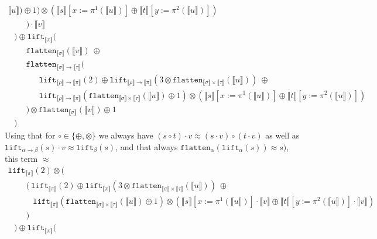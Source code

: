 \documentclass[runningheads,a4paper]{llncs}
\newcommand{\typeinterpret}[1]{\llbracket #1 \rrbracket}
\newcommand{\interpret}[1]{\llbracket #1 \rrbracket}
\newcommand{\arrtype}{\rightarrow}
\newcommand{\flatten}{\mathtt{flatten}}
\newcommand{\lift}{\mathtt{lift}}
\begin{document}
\begin{itemize}
\[\begin{array}{l}
      \interpret{u}) \oplus 1) \otimes
      (\interpret{s}[x:=\pi^1(\interpret{u})] \oplus
       \interpret{t}[y:=\pi^2(\interpret{u})]) \\
    \phantom{ABC}
    ) \cdot \interpret{v} \\
    \phantom{A} ) \oplus \lift_{\typeinterpret{\pi}}(\\
    \phantom{ABC}\flatten_{\typeinterpret{\sigma}}(\interpret{v})\ 
      \oplus \\
    \phantom{ABC}\flatten_{\typeinterpret{\sigma} \arrtype
      \typeinterpret{\tau}}( \\
      \phantom{ABCDE}
       \lift_{\typeinterpret{\rho} \arrtype \typeinterpret{\pi}}(2)
       \oplus \lift_{\typeinterpret{\rho} \arrtype
       \typeinterpret{\pi}}(3 \otimes \flatten_{\typeinterpret{\sigma}
       \times \typeinterpret{\tau}}(\interpret{u}))\ \oplus \\
    \phantom{ABCDE}
      \lift_{\typeinterpret{\rho} \arrtype \typeinterpret{\pi}}(
      \flatten_{\typeinterpret{\sigma} \times \typeinterpret{\tau}}(
      \interpret{u}) \oplus 1) \otimes
      (\interpret{s}[x:=\pi^1(\interpret{u})] \oplus
       \interpret{t}[y:=\pi^2(\interpret{u})]) \\
    \phantom{ABC} ) \otimes
    \flatten_{\typeinterpret{\sigma}}(\interpret{v}) \oplus 1 \\
    \phantom{A} )
  \end{array}
  \]
  Using that for $\circ \in \{\oplus,\otimes\}$ we always have
  $(s \circ t) \cdot v \approx (s \cdot v) \circ (t \cdot v)$ as well
  as $\lift_{\alpha\arrtype \beta}(s) \cdot v \approx \lift_\beta(s)$,
  and that always $\flatten_\alpha(\lift_\alpha(s)) \approx s)$, this
  term $\approx$
  \[
  \begin{array}{l}
  \lift_{\typeinterpret{\pi}}(2) \otimes (\\
    \phantom{ABC}
    (\ \lift_{\typeinterpret{\pi}}(2) \oplus
       \lift_{\typeinterpret{\pi}}(3 \otimes
          \flatten_{\typeinterpret{\sigma} \times
          \typeinterpret{\tau}}(\interpret{u}))\ \oplus \\
    \phantom{ABCD}
      \lift_{\typeinterpret{\pi}}(
      \flatten_{\typeinterpret{\sigma} \times \typeinterpret{\tau}}(
      \interpret{u}) \oplus 1) \otimes
      (\interpret{s}[x:=\pi^1(\interpret{u})] \cdot \interpret{v} \oplus
       \interpret{t}[y:=\pi^2(\interpret{u})] \cdot \interpret{v}) \\
    \phantom{ABC}
    )\\
    \phantom{A} ) \oplus \lift_{\typeinterpret{\pi}}(\\

\end{array}\]
\end{itemize}
\end{document}
